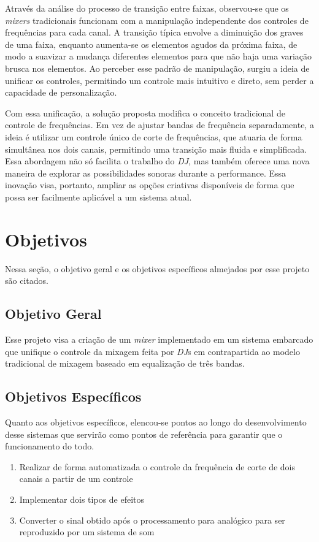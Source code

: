 Através da análise do processo de transição entre faixas, observou-se que os \textit{mixers} tradicionais funcionam com a manipulação independente dos controles de frequências para cada canal. A transição típica envolve a diminuição dos graves de uma faixa, enquanto aumenta-se os elementos agudos da próxima faixa, de modo a suavizar a mudança diferentes elementos para que não haja uma variação brusca nos elementos. Ao perceber esse padrão de manipulação, surgiu a ideia de unificar os controles, permitindo um controle mais intuitivo e direto, sem perder a capacidade de personalização.

Com essa unificação, a solução proposta modifica o conceito tradicional de controle de frequências. Em vez de ajustar bandas de frequência separadamente, a ideia é utilizar um controle único de corte de frequências, que atuaria de forma simultânea nos dois canais, permitindo uma transição mais fluida e simplificada. Essa abordagem não só facilita o trabalho do \textit{DJ}, mas também oferece uma nova maneira de explorar as possibilidades sonoras durante a performance. Essa inovação visa, portanto, ampliar as opções criativas disponíveis de forma que possa ser facilmente aplicável a um sistema atual. 

\section{Objetivos}

Nessa seção, o objetivo geral e os objetivos específicos almejados por esse projeto são citados.

\subsection{Objetivo Geral}
Esse projeto visa a criação de um \textit{mixer} implementado em um sistema embarcado que unifique o controle da mixagem feita por \textit{DJ}s em contrapartida ao modelo tradicional de mixagem baseado em equalização de três bandas.

\subsection{Objetivos Específicos}

Quanto aos objetivos específicos, elencou-se pontos ao longo do desenvolvimento desse sistemas que servirão como pontos de referência para garantir que o funcionamento do todo. 

\begin{enumerate}
    \item \label{item:deslocamento} Realizar de forma automatizada o controle da frequência de corte de dois canais a partir de um controle
    \item \label{item:efeitos} Implementar dois tipos de efeitos
    \item \label{item:conversao} Converter o sinal obtido após o processamento para analógico para ser reproduzido por um sistema de som
\end{enumerate}

